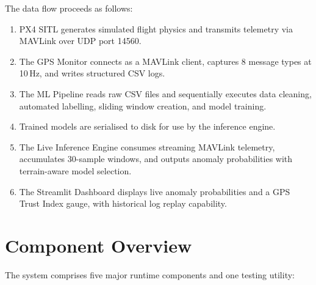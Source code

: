 The data flow proceeds as follows:
\begin{enumerate}
    \item PX4 SITL generates simulated flight physics and transmits telemetry via MAVLink over UDP port 14560.
    \item The GPS Monitor connects as a MAVLink client, captures 8 message types at 10\,Hz, and writes structured CSV logs.
    \item The ML Pipeline reads raw CSV files and sequentially executes data cleaning, automated labelling, sliding window creation, and model training.
    \item Trained models are serialised to disk for use by the inference engine.
    \item The Live Inference Engine consumes streaming MAVLink telemetry, accumulates 30-sample windows, and outputs anomaly probabilities with terrain-aware model selection.
    \item The Streamlit Dashboard displays live anomaly probabilities and a GPS Trust Index gauge, with historical log replay capability.
\end{enumerate}

\section{Component Overview}

The system comprises five major runtime components and one testing utility:

